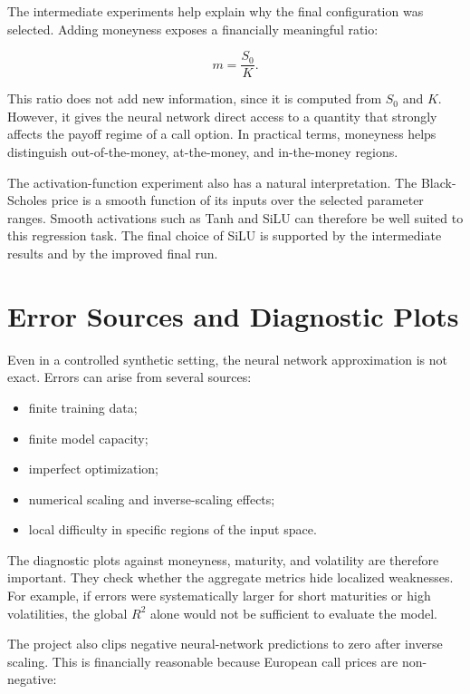 The intermediate experiments help explain why the final configuration was selected.
Adding moneyness exposes a financially meaningful ratio:

\begin{equation}
    m = \frac{S_0}{K}.
\end{equation}

This ratio does not add new information, since it is computed from $S_0$ and $K$.
However, it gives the neural network direct access to a quantity that strongly affects the payoff regime of a call option.
In practical terms, moneyness helps distinguish out-of-the-money, at-the-money, and in-the-money regions.

The activation-function experiment also has a natural interpretation.
The Black-Scholes price is a smooth function of its inputs over the selected parameter ranges.
Smooth activations such as Tanh and SiLU can therefore be well suited to this regression task.
The final choice of SiLU is supported by the intermediate results and by the improved final run.

\section{Error Sources and Diagnostic Plots}

Even in a controlled synthetic setting, the neural network approximation is not exact.
Errors can arise from several sources:

\begin{itemize}
    \item finite training data;
    \item finite model capacity;
    \item imperfect optimization;
    \item numerical scaling and inverse-scaling effects;
    \item local difficulty in specific regions of the input space.
\end{itemize}
The diagnostic plots against moneyness, maturity, and volatility are therefore important.
They check whether the aggregate metrics hide localized weaknesses.
For example, if errors were systematically larger for short maturities or high volatilities, the global $R^2$ alone would not be sufficient to evaluate the model.

The project also clips negative neural-network predictions to zero after inverse scaling.
This is financially reasonable because European call prices are non-negative:

